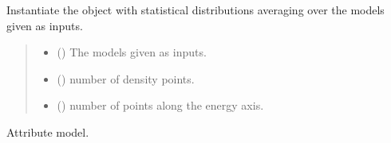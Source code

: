 \documentclass[letterpaper,10pt,english]{sphinxmanual}
\begin{document}
\begin{fulllineitems}
\label{\detokenize{source/api/setup_band:nucleardatapy.setup_band.SetupBand}}
\pysigstartsignatures
{}
\pysigstopsignatures
\sphinxAtStartPar
Instantiate the object with statistical distributions averaging over
the models given as inputs.
\begin{quote}\begin{description}
\begin{itemize}
\item {} 
\sphinxAtStartPar
{} () \textendash{} The models given as inputs.

\item {} 
\sphinxAtStartPar
{} (\sphinxstyleliteralemphasis{\sphinxupquote{, }}) \textendash{} number of density points.

\item {} 
\sphinxAtStartPar
{} (\sphinxstyleliteralemphasis{\sphinxupquote{, }}) \textendash{} number of points along the energy axis.

\end{itemize}

\end{description}\end{quote}

\sphinxAtStartPar
{}

\begin{fulllineitems}
\label{\detokenize{source/api/setup_band:nucleardatapy.setup_band.SetupBand.models}}
\pysigstartsignatures
{}
\pysigstopsignatures
\sphinxAtStartPar
Attribute model.


\end{fulllineitems}
\end{fulllineitems}
\end{document}
